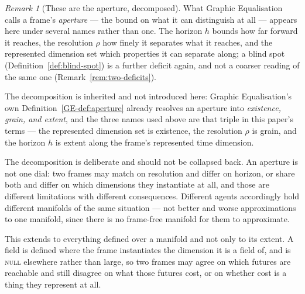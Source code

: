 \documentclass[11pt,a4paper]{article}
\theoremstyle{remark}
\newtheorem{remark}[definition]{Remark}
\begin{document}
\begin{remark}[These are the aperture, decomposed]\label{rem:aperture}
What Graphic Equalisation calls a frame's \emph{aperture} --- the bound on what it can distinguish
at all --- appears here under several names rather than one. The horizon $h$ bounds how far forward
it reaches, the resolution $\rho$ how finely it separates what it reaches, and the represented
dimension set which properties it can separate along; a blind spot (Definition~\ref{def:blind-spot})
is a further deficit again, and not a coarser reading of the same one
(Remark~\ref{rem:two-deficits}).

The decomposition is inherited and not introduced here: Graphic Equalisation's own
Definition~\ref{GE-def:aperture} already resolves an aperture into \emph{existence, grain, and extent}, and the three names used above are that
triple in this paper's terms --- the represented dimension set is existence, the resolution $\rho$ is
grain, and the horizon $h$ is extent along the frame's represented time dimension.

The decomposition is deliberate and should not be collapsed back. An aperture is not one dial: two
frames may match on resolution and differ on horizon, or share both and differ on which dimensions
they instantiate at all, and those are different limitations with different consequences. Different
agents accordingly hold different manifolds of the same situation --- not better and worse
approximations to one manifold, since there is no frame-free manifold for them to approximate.

This extends to everything defined over a manifold and not only to its extent. A field is defined
where the frame instantiates the dimension it is a field of, and is \textsc{null} elsewhere rather
than large, so two frames may agree on which futures are reachable and still disagree on what those
futures cost, or on whether cost is a thing they represent at all.
\end{remark}
\end{document}
